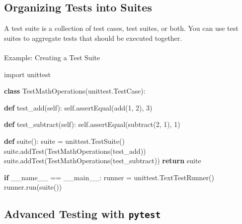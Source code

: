 \documentclass[
  letterpaper,
  DIV=11,
  numbers=noendperiod]{scrreprt}
\makeatletter
\let\oldparagraph\paragraph
\renewcommand{\paragraph}{
    \@ifstar
      \xxxParagraphStar
      \xxxParagraphNoStar
  }
\newcommand{\xxxParagraphStar}[1]{\oldparagraph*{#1}\mbox{}}
\newcommand{\xxxParagraphNoStar}[1]{\oldparagraph{#1}\mbox{}}
\newenvironment{Shaded}{\begin{snugshade}}{\end{snugshade}}
\newcommand{\ControlFlowTok}[1]{\textcolor[rgb]{0.00,0.23,0.31}{\textbf{#1}}}
\newcommand{\DecValTok}[1]{\textcolor[rgb]{0.68,0.00,0.00}{#1}}
\newcommand{\ImportTok}[1]{\textcolor[rgb]{0.00,0.46,0.62}{#1}}
\newcommand{\KeywordTok}[1]{\textcolor[rgb]{0.00,0.23,0.31}{\textbf{#1}}}
\newcommand{\NormalTok}[1]{\textcolor[rgb]{0.00,0.23,0.31}{#1}}
\newcommand{\OperatorTok}[1]{\textcolor[rgb]{0.37,0.37,0.37}{#1}}
\newcommand{\StringTok}[1]{\textcolor[rgb]{0.13,0.47,0.30}{#1}}
\newcommand{\VariableTok}[1]{\textcolor[rgb]{0.07,0.07,0.07}{#1}}
\makeatother
\begin{document}
\subsection{Organizing Tests into
Suites}\label{organizing-tests-into-suites}

A test suite is a collection of test cases, test suites, or both. You
can use test suites to aggregate tests that should be executed together.

\paragraph{Example: Creating a Test
Suite}\label{example-creating-a-test-suite}

\begin{Shaded}
\begin{Highlighting}[]
\ImportTok{import}\NormalTok{ unittest}

\KeywordTok{class}\NormalTok{ TestMathOperations(unittest.TestCase):}

    \KeywordTok{def}\NormalTok{ test\_add(}\VariableTok{self}\NormalTok{):}
        \VariableTok{self}\NormalTok{.assertEqual(add(}\DecValTok{1}\NormalTok{, }\DecValTok{2}\NormalTok{), }\DecValTok{3}\NormalTok{)}

    \KeywordTok{def}\NormalTok{ test\_subtract(}\VariableTok{self}\NormalTok{):}
        \VariableTok{self}\NormalTok{.assertEqual(subtract(}\DecValTok{2}\NormalTok{, }\DecValTok{1}\NormalTok{), }\DecValTok{1}\NormalTok{)}

\KeywordTok{def}\NormalTok{ suite():}
\NormalTok{    suite }\OperatorTok{=}\NormalTok{ unittest.TestSuite()}
\NormalTok{    suite.addTest(TestMathOperations(}\StringTok{\textquotesingle{}test\_add\textquotesingle{}}\NormalTok{))}
\NormalTok{    suite.addTest(TestMathOperations(}\StringTok{\textquotesingle{}test\_subtract\textquotesingle{}}\NormalTok{))}
    \ControlFlowTok{return}\NormalTok{ suite}

\ControlFlowTok{if} \VariableTok{\_\_name\_\_} \OperatorTok{==} \StringTok{\textquotesingle{}\_\_main\_\_\textquotesingle{}}\NormalTok{:}
\NormalTok{    runner }\OperatorTok{=}\NormalTok{ unittest.TextTestRunner()}
\NormalTok{    runner.run(suite())}
\end{Highlighting}
\end{Shaded}

\subsection{\texorpdfstring{Advanced Testing with
\texttt{pytest}}{Advanced Testing with pytest}}\label{advanced-testing-with-pytest}
\end{document}
